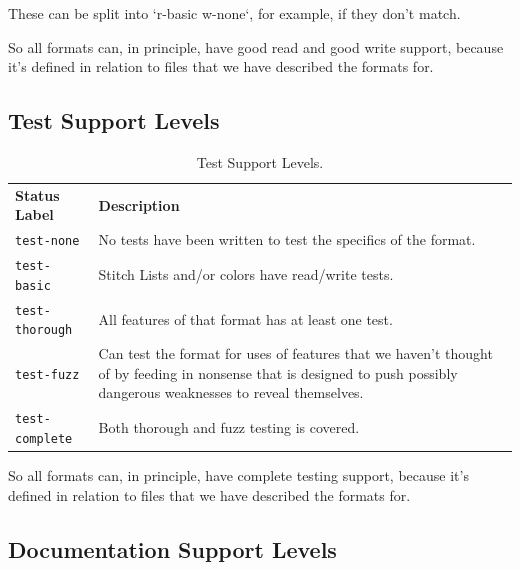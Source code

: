 \documentclass[a4paper]{report}
\begin{document}
These can be split into `r-basic w-none`, for example, if they don't match.

So all formats can, in principle, have good read and good write support, because it's defined in relation to files that we have described the formats for.

\subsection{Test Support Levels}

\begin{longtable}{p{4cm} p{8cm}}
\caption{Test Support Levels.}
\label{tab:test-support} \\
\textbf{Status Label} &
\textbf{Description} \\

\texttt{test-none} &
No tests have been written to test the specifics of the format. \\

\texttt{test-basic} &
Stitch Lists and/or colors have read/write tests. \\

\texttt{test-thorough} &
All features of that format has at least one test. \\

\texttt{test-fuzz} &
Can test the format for uses of features that we haven't thought of by feeding
in nonsense that is designed to push possibly dangerous weaknesses to reveal
themselves. \\

\texttt{test-complete} &
Both thorough and fuzz testing is covered.
\end{longtable}

So all formats can, in principle, have complete testing support, because it's
defined in relation to files that we have described the formats for.

\subsection{Documentation Support Levels}
\end{document}
